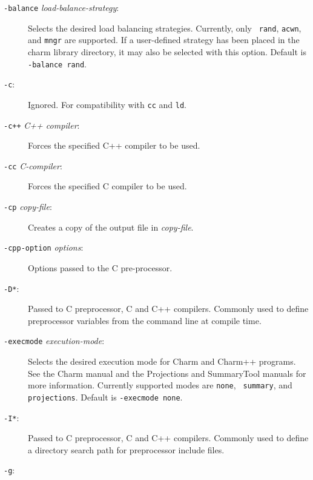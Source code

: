 \begin{description}

\item[{\tt -balance} {\em load-balance-strategy}:]

Selects the desired load balancing strategies.  Currently, only {\tt
rand}, {\tt acwn}, and {\tt mngr} are supported. If a user-defined
strategy has been placed in the charm library directory, it may also
be selected with this option.  Default is {\tt -balance rand}.
	
\item[{\tt -c}:]

Ignored.  For compatibility with {\tt cc} and {\tt ld}.

\item[{\tt -c++} {\em C++ compiler}:]

Forces the specified C++ compiler to be used.

\item[{\tt -cc} {\em C-compiler}:]

Forces the specified C compiler to be used.

\item[{\tt -cp} {\em copy-file}:]

Creates a copy of the output file in {\em copy-file}.

\item[{\tt -cpp-option} {\em options}:]

Options passed to the C pre-processor.

\item[{\tt -D*}:]

Passed to C preprocessor, C and C++ compilers.  Commonly used to
define preprocessor variables from the command line at compile
time.

\item[{\tt -execmode} {\em execution-mode}:]

Selects the desired execution mode for Charm and Charm++ programs.
See the Charm manual and the Projections and SummaryTool manuals for
more information.  Currently supported modes are {\tt none}, {\tt
summary}, and {\tt projections}. Default is {\tt -execmode none}.

\item[{\tt -I*}:]

Passed to C preprocessor, C and C++ compilers.  Commonly used to
define a directory search path for preprocessor include files.

\item[{\tt -g}:]


\end{description}
